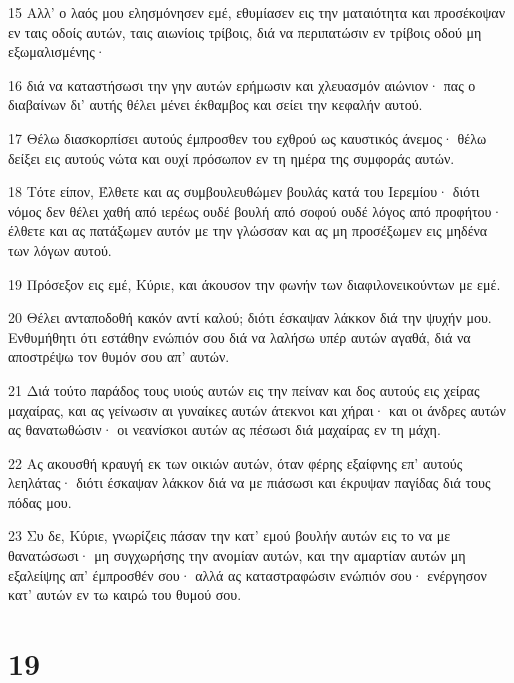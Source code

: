 \par 15 Αλλ' ο λαός μου ελησμόνησεν εμέ, εθυμίασεν εις την ματαιότητα και προσέκοψαν εν ταις οδοίς αυτών, ταις αιωνίοις τρίβοις, διά να περιπατώσιν εν τρίβοις οδού μη εξωμαλισμένης·
\par 16 διά να καταστήσωσι την γην αυτών ερήμωσιν και χλευασμόν αιώνιον· πας ο διαβαίνων δι' αυτής θέλει μένει έκθαμβος και σείει την κεφαλήν αυτού.
\par 17 Θέλω διασκορπίσει αυτούς έμπροσθεν του εχθρού ως καυστικός άνεμος· θέλω δείξει εις αυτούς νώτα και ουχί πρόσωπον εν τη ημέρα της συμφοράς αυτών.
\par 18 Τότε είπον, Έλθετε και ας συμβουλευθώμεν βουλάς κατά του Ιερεμίου· διότι νόμος δεν θέλει χαθή από ιερέως ουδέ βουλή από σοφού ουδέ λόγος από προφήτου· έλθετε και ας πατάξωμεν αυτόν με την γλώσσαν και ας μη προσέξωμεν εις μηδένα των λόγων αυτού.
\par 19 Πρόσεξον εις εμέ, Κύριε, και άκουσον την φωνήν των διαφιλονεικούντων με εμέ.
\par 20 Θέλει ανταποδοθή κακόν αντί καλού; διότι έσκαψαν λάκκον διά την ψυχήν μου. Ενθυμήθητι ότι εστάθην ενώπιόν σου διά να λαλήσω υπέρ αυτών αγαθά, διά να αποστρέψω τον θυμόν σου απ' αυτών.
\par 21 Διά τούτο παράδος τους υιούς αυτών εις την πείναν και δος αυτούς εις χείρας μαχαίρας, και ας γείνωσιν αι γυναίκες αυτών άτεκνοι και χήραι· και οι άνδρες αυτών ας θανατωθώσιν· οι νεανίσκοι αυτών ας πέσωσι διά μαχαίρας εν τη μάχη.
\par 22 Ας ακουσθή κραυγή εκ των οικιών αυτών, όταν φέρης εξαίφνης επ' αυτούς λεηλάτας· διότι έσκαψαν λάκκον διά να με πιάσωσι και έκρυψαν παγίδας διά τους πόδας μου.
\par 23 Συ δε, Κύριε, γνωρίζεις πάσαν την κατ' εμού βουλήν αυτών εις το να με θανατώσωσι· μη συγχωρήσης την ανομίαν αυτών, και την αμαρτίαν αυτών μη εξαλείψης απ' έμπροσθέν σου· αλλά ας καταστραφώσιν ενώπιόν σου· ενέργησον κατ' αυτών εν τω καιρώ του θυμού σου.

\chapter{19}

